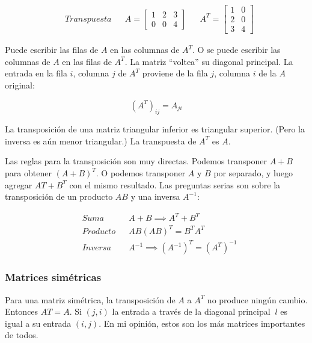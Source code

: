 \begin{align*}
	 & Transpuesta &  & A=\begin{bmatrix}
		                      1 & 2 & 3 \\0&0&4
	                      \end{bmatrix} &  & A^T=\begin{bmatrix}
		                                             1 & 0 \\2&0\\3&4
	                                             \end{bmatrix}
\end{align*}

Puede escribir las filas de $A$ en las columnas de $A^T$. O se puede escribir las columnas de $A$
en las filas de $A^T$. La matriz ``voltea'' su diagonal principal. La entrada en la fila $i$, columna $j$
de $A^T$ proviene de la fila $j$, columna $i$ de la $A$ original:

\begin{equation}
	\left(A^T\right)_{ij}=A_{ji}
\end{equation}

La transposición de una matriz triangular inferior es triangular superior. (Pero la inversa es aún menor
triangular.) La transpuesta de $A^T$ es $A$.

Las reglas para la transposición son muy directas. Podemos transponer $A + B$ para obtener $(A + B)^T$.
O podemos transponer $A$ y $B$ por separado, y luego agregar $AT+B^T$ con el mismo resultado.
Las preguntas serias son sobre la transposición de un producto $AB$ y una inversa $A^{-1}$:

\begin{align}
	 & Suma     &  & A+B\implies A^T+B^T                                        \\
	 & Producto &  & AB \left(AB\right)^T=B^T A^T                               \\
	 & Inversa  &  & A^{-1}\implies \left(A^{-1}\right)^T=\left(A^T\right)^{-1}
\end{align}

\subsubsection{Matrices simétricas}

Para una matriz simétrica, la transposición de $A$ a $A^T$ no produce ningún cambio. Entonces $AT = A$. Si $(j, i)$
la entrada a través de la diagonal principal $~l$ es igual a su entrada $(i, j)$. En mi opinión, estos son los más
matrices importantes de todos.

